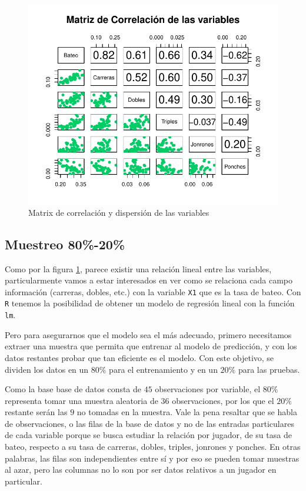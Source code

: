 \documentclass{staprojteamusb}
\begin{document}
 \begin{figure}[h]
 \centering
 \includegraphics{C03322-InformeFinal-Cordero-Gavazut-Riera_files/figure-latex/correlacion-1.pdf}
 \caption{\label{fig:correlacion}Matrix de correlación y dispersión de las variables}
 \end{figure}

 \hypertarget{muestreo-80-20}{%
 \subsection{Muestreo 80\%-20\%}\label{muestreo-80-20}}

 Como por la figura \ref{fig:correlacion}, parece existir una relación lineal entre las variables, particularmente vamos a estar interesados en ver como se relaciona cada campo información (carreras, dobles, etc.) con la variable \texttt{X1} que es la tasa de bateo. Con \texttt{R} tenemos la posibilidad de obtener un modelo de regresión lineal con la función \texttt{lm}.

 Pero para asegurarnos que el modelo sea el más adecuado, primero necesitamos extraer una muestra que permita que entrenar al modelo de predicción, y con los datos restantes probar que tan eficiente es el modelo. Con este objetivo, se dividen los datos en un \(80\%\) para el entrenamiento y en un \(20\%\) para las pruebas.

 Como la base base de datos consta de \(45\) observaciones por variable, el \(80\%\) representa tomar una muestra aleatoria de \(36\) observaciones, por los que el \(20\%\) restante serán las \(9\) no tomadas en la muestra. Vale la pena resaltar que se habla de observaciones, o las filas de la base de datos y no de las entradas particulares de cada variable porque se busca estudiar la relación por jugador, de su tasa de bateo, respecto a su tasa de carreras, dobles, triples, jonrones y ponches. En otras palabras, las filas son independientes entre sí y por eso se pueden tomar muestras al azar, pero las columnas no lo son por ser datos relativos a un jugador en particular.
\end{document}
